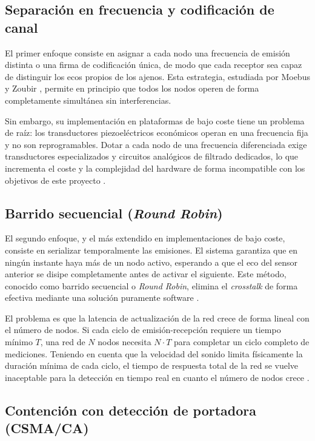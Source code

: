 \subsection{Separación en frecuencia y codificación de canal}

El primer enfoque consiste en asignar a cada nodo una frecuencia de emisión distinta o una firma de codificación única, de modo que cada receptor sea capaz de distinguir los ecos propios de los ajenos. Esta estrategia, estudiada por Moebus y Zoubir \cite{10}, permite en principio que todos los nodos operen de forma completamente simultánea sin interferencias.

Sin embargo, su implementación en plataformas de bajo coste tiene un problema de raíz: los transductores piezoeléctricos económicos operan en una frecuencia fija y no son reprogramables. Dotar a cada nodo de una frecuencia diferenciada exige transductores especializados y circuitos analógicos de filtrado dedicados, lo que incrementa el coste y la complejidad del hardware de forma incompatible con los objetivos de este proyecto \cite{10}.

\subsection{Barrido secuencial (\textit{Round Robin})}

El segundo enfoque, y el más extendido en implementaciones de bajo coste, consiste en serializar temporalmente las emisiones. El sistema garantiza que en ningún instante haya más de un nodo activo, esperando a que el eco del sensor anterior se disipe completamente antes de activar el siguiente. Este método, conocido como barrido secuencial o \textit{Round Robin}, elimina el \textit{crosstalk} de forma efectiva mediante una solución puramente software \cite{11}.

El problema es que la latencia de actualización de la red crece de forma lineal con el número de nodos. Si cada ciclo de emisión-recepción requiere un tiempo mínimo $T$, una red de $N$ nodos necesita $N \cdot T$ para completar un ciclo completo de mediciones. Teniendo en cuenta que la velocidad del sonido limita físicamente la duración mínima de cada ciclo, el tiempo de respuesta total de la red se vuelve inaceptable para la detección en tiempo real en cuanto el número de nodos crece \cite{11}.

\subsection{Contención con detección de portadora (CSMA/CA)}

